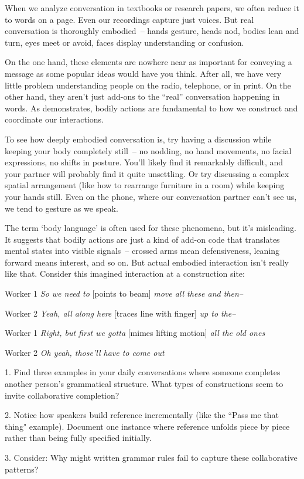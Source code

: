 When we analyze conversation in textbooks or research papers, we often reduce it to words on a page. Even our recordings capture just voices. But real conversation is thoroughly embodied~-- hands gesture, heads nod, bodies lean and turn, eyes meet or avoid, faces display understanding or confusion.

On the one hand, these elements are nowhere near as important for conveying a message as some popular ideas would have you think. After all, we have very little problem understanding people on the radio, telephone, or in print. On the other hand, they aren't just add-ons to the ``real'' conversation happening in words. As \citet{goodwin2000} demonstrates, bodily actions are fundamental to how we construct and coordinate our interactions.

To see how deeply embodied conversation is, try having a discussion while keeping your body completely still~-- no nodding, no hand movements, no facial expressions, no shifts in posture. You'll likely find it remarkably difficult, and your partner will probably find it quite unsettling. Or try discussing a complex spatial arrangement (like how to rearrange furniture in a room) while keeping your hands still. Even on the phone, where our conversation partner can't see us, we tend to gesture as we speak.

The term `body language' is often used for these phenomena, but it's misleading. It suggests that bodily actions are just a kind of add-on code that translates mental states into visible signals~-- crossed arms mean defensiveness, leaning forward means interest, and so on. But actual embodied interaction isn't really like that. Consider this imagined interaction at a construction site:

\ea
\begin{dialogue}
\item[Worker 1] \textit{So we need to }[points to beam]\textit{ move all these and then--} 
\item[Worker 2] \textit{Yeah, all along here }[traces line with finger]\textit{ up to the--}
\item[Worker 1] \textit{Right, but first we gotta }[mimes lifting motion]\textit{ all the old ones}
\item[Worker 2] \textit{Oh yeah, those'll have to come out}
\end{dialogue}
\z

\begin{tcolorbox}[title=Exercise: Grammar as Real-Time Resource, colback=white, colframe=green!75!black, fonttitle=\bfseries]
1. Find three examples in your daily conversations where someone completes another person's grammatical structure. What types of constructions seem to invite collaborative completion?

2. Notice how speakers build reference incrementally (like the ``Pass me that thing" example). Document one instance where reference unfolds piece by piece rather than being fully specified initially.

3. Consider: Why might written grammar rules fail to capture these collaborative patterns?
\end{tcolorbox}

